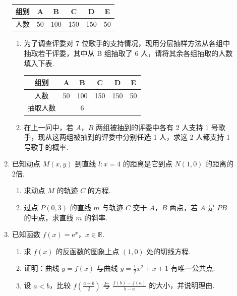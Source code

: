 \begin{description}
\begin{enumerate}[leftmargin=5pt]
\begin{center}
\begingroup
\small
\renewcommand{\arraystretch}{1.2}
\begin{tabular}{|c|c|c|c|c|c|}
\hline
组别 & A & B & C & D & E \\
\hline
人数 & 50 & 100 & 150 & 150 & 50 \\
\hline
\end{tabular}
\endgroup
\end{center}

\begin{enumerate}
\item 为了调查评委对 7 位歌手的支持情况，现用分层抽样方法从各组中抽取若干评委，其中从 B 组抽取了 6 人，请将其余各组抽取的人数填入下表.

\begin{center}
\begingroup
\small
\renewcommand{\arraystretch}{1.2}
\begin{tabular}{|c|c|c|c|c|c|}
\hline
组别 & A & B & C & D & E \\
\hline
人数 & 50 & 100 & 150 & 150 & 50 \\
\hline
抽取人数 &  & 6 &  &  &  \\
\hline
\end{tabular}
\endgroup
\end{center}

\item 在上一问中，若 \(A\)，\(B\) 两组被抽到的评委中各有 2 人支持 1 号歌手，现从这两组被抽到的评委中分别任选 1 人，求这 2 人都支持 1 号歌手的概率.
\end{enumerate}

        \item 已知动点 \(M(x, y)\) 到直线 \(l: x = 4\) 的距离是它到点 \(N(1,0)\) 的距离的2倍.

\begin{enumerate}
\item 求动点 \(M\) 的轨迹 \(C\) 的方程.
\item 过点 \(P(0,3)\) 的直线 \(m\) 与轨迹 \(C\) 交于 \(A\)，\(B\) 两点，若 \(A\) 是 \(PB\) 的中点，求直线 \(m\) 的斜率.
\end{enumerate}

        \item 已知函数 \(f(x) = {\mathrm{e}}^{x}\)，\(x \in \mathbb{R}\).

\begin{enumerate}
\item 求 \( f(x) \) 的反函数的图象上点 \((1,0)\) 处的切线方程.
\item 证明：曲线 \( y = f(x) \) 与曲线 \( y = \frac{1}{2} x^2 + x + 1 \) 有唯一公共点.
\item 设 \(a < b\)，比较 \(f\left(\frac{a + b}{2}\right)\) 与 \(\frac{f(b) - f(a)}{b - a}\) 的大小，并说明理由.
\end{enumerate}

    \end{enumerate}

\end{description}


